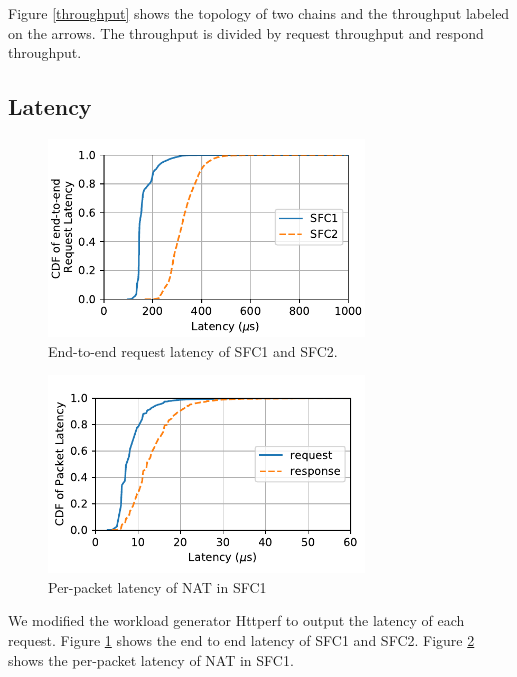 \documentclass{sig-alternate-10pt}
\begin{document}
Figure \ref{throughput} shows the topology of two chains
and the throughput labeled on the arrows.
The throughput is divided by request throughput and respond throughput.

\subsection{Latency}

\begin{figure}[t]
\centering
\includegraphics[width=3.3in]{e2e_latency_chain12.pdf}
\caption{End-to-end request latency of SFC1 and SFC2.}
\label{e2e_latency}
\end{figure}

\begin{figure}[t]
\centering
\includegraphics[width=3.3in]{cdf_chain1.pdf}
\caption{Per-packet latency of NAT in SFC1}
\label{nat_latency}
\end{figure}

We modified the workload generator Httperf to output the latency of each request.
Figure \ref{e2e_latency} shows the end to end latency of SFC1 and SFC2.
Figure \ref{nat_latency} shows the per-packet latency of NAT in SFC1.



\end{document}
